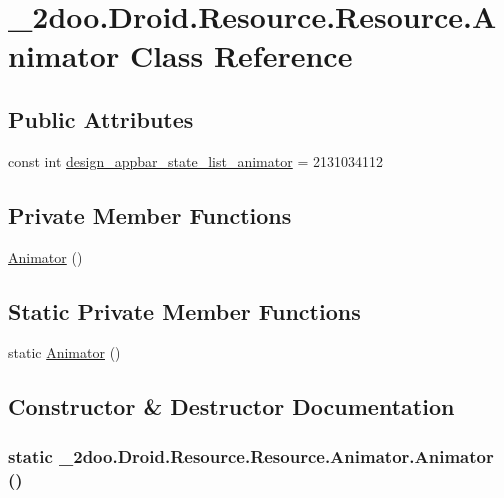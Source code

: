 \hypertarget{class__2doo_1_1_droid_1_1_resource_1_1_animator}{
\section{\_\-2doo.Droid.Resource.Resource.Animator Class Reference}
\label{class__2doo_1_1_droid_1_1_resource_1_1_animator}
}
\subsection*{Public Attributes}
\begin{CompactItemize}
\item 
const int \hyperlink{class__2doo_1_1_droid_1_1_resource_1_1_animator_b8a7171c0d2de1c76bbb34de63c86ade}{design\_\-appbar\_\-state\_\-list\_\-animator} = 2131034112
\end{CompactItemize}
\subsection*{Private Member Functions}
\begin{CompactItemize}
\item 
\hyperlink{class__2doo_1_1_droid_1_1_resource_1_1_animator_7904bf1e47d819f43fd75909358cf03e}{Animator} ()
\end{CompactItemize}
\subsection*{Static Private Member Functions}
\begin{CompactItemize}
\item 
static \hyperlink{class__2doo_1_1_droid_1_1_resource_1_1_animator_26e05b1f2a992753d911539f014dc30e}{Animator} ()
\end{CompactItemize}


\subsection{Constructor \& Destructor Documentation}
\hypertarget{class__2doo_1_1_droid_1_1_resource_1_1_animator_26e05b1f2a992753d911539f014dc30e}{
\subsubsection[{Animator}]{\setlength{\rightskip}{0pt plus 5cm}static \_\-2doo.Droid.Resource.Resource.Animator.Animator ()}}
\label{class__2doo_1_1_droid_1_1_resource_1_1_animator_26e05b1f2a992753d911539f014dc30e}


